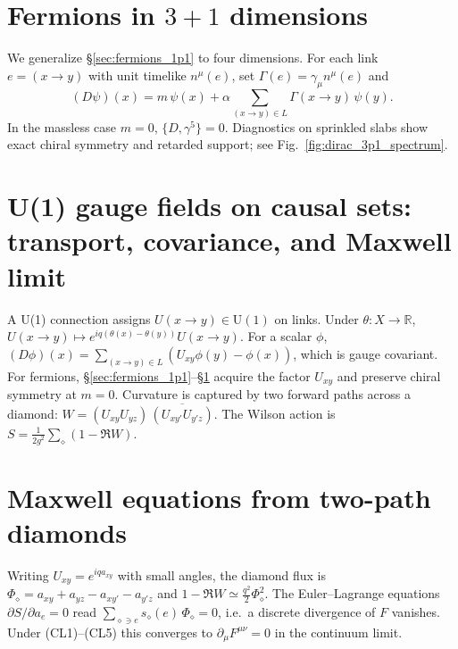 \documentclass[12pt,a4paper]{article}
\begin{document}
\section{Fermions in $3{+}1$ dimensions}\label{sec:fermions_3p1}
We generalize \S\ref{sec:fermions_1p1} to four dimensions. For each link $e=(x\to y)$ with unit timelike $n^\mu(e)$, set $\Gamma(e)=\gamma_\mu n^\mu(e)$ and
\begin{equation}
  (D\psi)(x)=m\,\psi(x)+\alpha\sum_{(x\to y)\in L} \Gamma(x\!\to\!y)\,\psi(y).\tag{$\ast$}
\end{equation}
In the massless case $m{=}0$, $\{D,\gamma^5\}=0$. Diagnostics on sprinkled slabs show exact chiral symmetry and retarded support; see Fig.~\ref{fig:dirac_3p1_spectrum}.

\section{U(1) gauge fields on causal sets: transport, covariance, and Maxwell limit}\label{sec:u1_gauge}
A U(1) connection assigns $U(x\!\to\!y)\in\mathrm{U}(1)$ on links. Under $\theta:X\to\mathbb R$,
$U(x\!\to\!y)\mapsto e^{iq(\theta(x)-\theta(y))}U(x\!\to\!y)$.
For a scalar $\phi$, $(D\phi)(x)=\sum_{(x\to y)\in L}(U_{xy}\phi(y)-\phi(x))$, which is gauge covariant.
For fermions, \S\ref{sec:fermions_1p1}--\S\ref{sec:fermions_3p1} acquire the factor $U_{xy}$ and preserve chiral symmetry at $m=0$.
Curvature is captured by two forward paths across a diamond: $W=(U_{xy}U_{yz})\,\overline{(U_{xy'}U_{y'z})}$.
The Wilson action is $S=\frac1{2g^2}\sum_{\diamond}(1-\Re W)$.


\section{Maxwell equations from two-path diamonds}\label{sec:maxwell_emerge}


Writing $U_{xy}=e^{iq a_{xy}}$ with small angles, the diamond flux is
$\Phi_\diamond = a_{xy}+a_{yz}-a_{xy'}-a_{y'z}$ and
$1-\Re W \simeq \tfrac{q^2}{2}\Phi_\diamond^2$.
The Euler--Lagrange equations $\partial S/\partial a_e=0$ read
$\sum_{\diamond\ni e}s_\diamond(e)\,\Phi_\diamond=0$, i.e.\ a discrete divergence of $F$ vanishes.
Under \textnormal{(CL1)--(CL5)} this converges to $\partial_\mu F^{\mu\nu}=0$ in the continuum limit.
\end{document}
